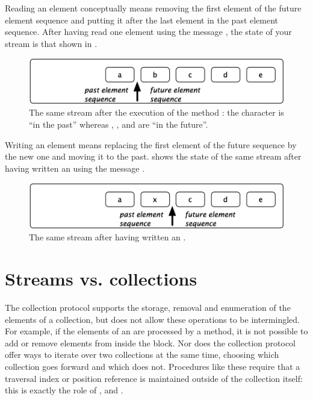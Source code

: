 \documentclass[a4paper,10pt,twoside]{book}
\begin{document}
Reading an element conceptually means removing the first element of the future element sequence  and putting it after the last element in the past
element sequence. After having read one element using the message , the state of your stream is that shown in .

\begin{figure}[ht]
\centerline{\includegraphics[scale=0.5]{a_bcdeStef}}
\caption{The same stream after the execution of the method : the character  is ``in the past'' whereas , ,  and  are ``in the future''.}
\label{fig:a_bcde}
\vspace{.2in}
\end{figure}

Writing an element means replacing the first element of the future sequence by the new one and moving it to the past.  shows the state of the same stream after having written an  using the message  .

\begin{figure}[h!t]
\centerline{\includegraphics[scale=0.5]{ax_cdeStef}}
\caption{The same stream after having written an .}
\label{fig:ax_cde}
\vspace{.2in}
\end{figure}

\section{Streams vs. collections}

The collection protocol supports the storage, removal and enumeration
of the elements of a collection, but does not allow these operations
to be intermingled.  For example, if the elements of an
 are processed by a  method, it is not
possible to add or remove elements from inside the  block.
Nor does the collection protocol offer ways to iterate over two
collections at the same time, choosing which collection goes forward
and which does not. Procedures like these require that a traversal index or
position reference is maintained outside of the collection itself:
this is exactly the role of ,  and
.
\end{document}
